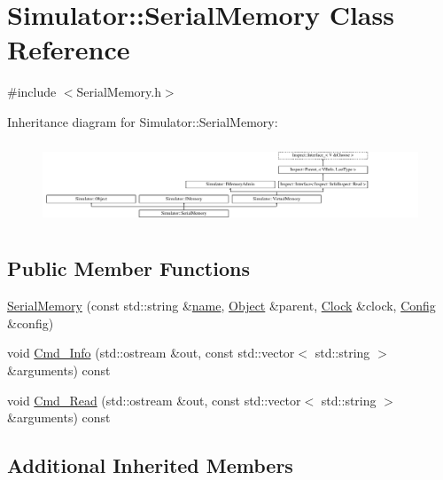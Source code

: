 \hypertarget{class_simulator_1_1_serial_memory}{\section{Simulator\+:\+:Serial\+Memory Class Reference}
\label{class_simulator_1_1_serial_memory}
}


{\ttfamily \#include $<$Serial\+Memory.\+h$>$}

Inheritance diagram for Simulator\+:\+:Serial\+Memory\+:\begin{figure}[H]
\begin{center}
\leavevmode
\includegraphics[height=2.456140cm]{class_simulator_1_1_serial_memory}
\end{center}
\end{figure}
\subsection*{Public Member Functions}
\begin{DoxyCompactItemize}
\item 
\hyperlink{class_simulator_1_1_serial_memory_add73e057ff1bce170095e08edeb6899b}{Serial\+Memory} (const std\+::string \&\hyperlink{mtconf_8c_a8f8f80d37794cde9472343e4487ba3eb}{name}, \hyperlink{class_simulator_1_1_object}{Object} \&parent, \hyperlink{class_simulator_1_1_clock}{Clock} \&clock, \hyperlink{class_config}{Config} \&config)
\item 
void \hyperlink{class_simulator_1_1_serial_memory_a101caa10c2d257d745677bb615cd5239}{Cmd\+\_\+\+Info} (std\+::ostream \&out, const std\+::vector$<$ std\+::string $>$ \&arguments) const 
\item 
void \hyperlink{class_simulator_1_1_serial_memory_ab84d932769db32ab300b38d4f8bafb36}{Cmd\+\_\+\+Read} (std\+::ostream \&out, const std\+::vector$<$ std\+::string $>$ \&arguments) const 
\end{DoxyCompactItemize}
\subsection*{Additional Inherited Members}


